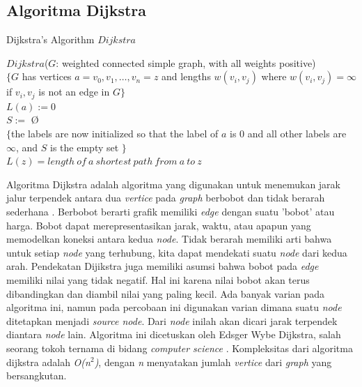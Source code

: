\documentclass[conference]{IEEEtran}
\begin{document}
\subsection{Algoritma Dijkstra}
\begin{algorithm}
    \caption{Dijkstra's Algorithm $Dijkstra$}
     $Dijkstra$($G$: weighted connected simple graph, with all weights positive) \\
    $\{ G$ has vertices $a = v_{0}, v_{1}, \dots, v_{n} = z$ and lengths $w(v_{i}, v_{j})$ where $w(v_{i}, v_{j}) = \infty$ if $v_{i}, v_{j}$ is not an edge in $G \}$ \\
    $L(a) := 0$ \\
    $S :=$ \O \\
    $\{$the labels are now initialized so that the label of $a$ is 0 and all other labels are $\infty$, and $S$ is the empty set $\}$ \\
     $L(z) = length\: of\: a\: shortest\: path\: from\: a\: to\: z$
\end{algorithm}
Algoritma Dijkstra adalah algoritma yang digunakan untuk menemukan jarak jalur terpendek antara dua \textit{vertice} pada \textit{graph} berbobot dan tidak berarah sederhana \cite{b2}.
Berbobot berarti grafik memiliki \textit{edge} dengan suatu 'bobot' atau harga.
Bobot dapat merepresentasikan jarak, waktu, atau apapun yang memodelkan koneksi antara kedua \textit{node}.
Tidak berarah memiliki arti bahwa untuk setiap \textit{node} yang terhubung, kita dapat mendekati suatu \textit{node} dari kedua arah.
Pendekatan Dijikstra juga memiliki asumsi bahwa bobot pada \textit{edge} memiliki nilai yang tidak negatif.
Hal ini karena nilai bobot akan terus dibandingkan dan diambil nilai yang paling kecil.
Ada banyak varian pada algoritma ini, namun pada percobaan ini digunakan varian dimana suatu \textit{node} ditetapkan menjadi \textit{source node}.
Dari \textit{node} inilah akan dicari jarak terpendek diantara \textit{node} lain.
Algoritma ini dicetuskan oleh Edsger Wybe Dijkstra, salah seorang tokoh ternama di bidang \textit{computer science} \cite{b3}.
Kompleksitas dari algoritma dijkstra adalah \textit{O(n$^{2}$)}, dengan \textit{n} menyatakan jumlah \textit{vertice} dari \textit{graph} yang bersangkutan.
\end{document}
